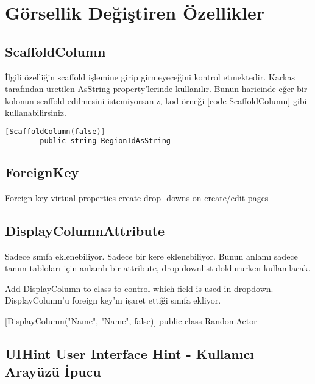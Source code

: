 \documentclass[10pt,a4paper]{article}
\begin{document}
\section{Görsellik Değiştiren Özellikler}


\subsection{ScaffoldColumn }
İlgili özelliğin scaffold işlemine girip girmeyeceğini kontrol etmektedir.
Karkas tarafından üretilen AsString property'lerinde kullanılır.
Bunun haricinde eğer bir kolonun scaffold edilmesini istemiyorsanız,
kod örneği \ref{code-ScaffoldColumn} gibi kullanabilirsiniz.




\begin{lstlisting}[label=code-ScaffoldColumn,caption=ScaffoldColumn,language=C]
		[ScaffoldColumn(false)]
		public string RegionIdAsString
\end{lstlisting}




\subsection{ForeignKey  }


		
Foreign key virtual properties create drop- downs on create/edit pages


\subsection{DisplayColumnAttribute}


Sadece sınıfa eklenebiliyor. Sadece bir kere eklenebiliyor. 
Bunun anlamı sadece tanım tabloları için anlamlı bir attribute, drop downlist doldururken kullanılacak.



Add DisplayColumn to class to control
which field is used in dropdown. DisplayColumn'u foreign key'ın işaret ettiği sınıfa ekliyor.

[DisplayColumn("Name", "Name", false)]
public class RandomActor


\subsection{UIHint User Interface Hint - Kullanıcı Arayüzü İpucu}
\end{document}
